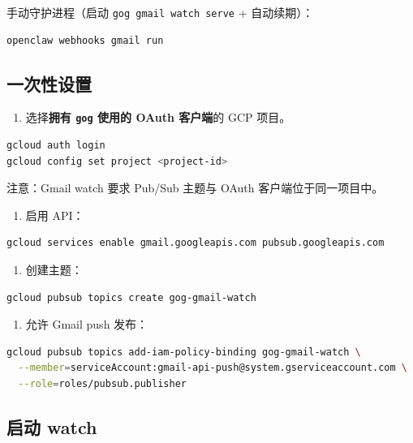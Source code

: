 手动守护进程（启动 \texttt{gog gmail watch serve} + 自动续期）：

\begin{lstlisting}[language=bash]
openclaw webhooks gmail run
\end{lstlisting}


\subsection{一次性设置}


\begin{enumerate}
  \item 选择\textbf{拥有 \texttt{gog} 使用的 OAuth 客户端}的 GCP 项目。
\end{enumerate}


\begin{lstlisting}[language=bash]
gcloud auth login
gcloud config set project <project-id>
\end{lstlisting}


注意：Gmail watch 要求 Pub/Sub 主题与 OAuth 客户端位于同一项目中。

\begin{enumerate}
  \item 启用 API：
\end{enumerate}


\begin{lstlisting}[language=bash]
gcloud services enable gmail.googleapis.com pubsub.googleapis.com
\end{lstlisting}


\begin{enumerate}
  \item 创建主题：
\end{enumerate}


\begin{lstlisting}[language=bash]
gcloud pubsub topics create gog-gmail-watch
\end{lstlisting}


\begin{enumerate}
  \item 允许 Gmail push 发布：
\end{enumerate}


\begin{lstlisting}[language=bash]
gcloud pubsub topics add-iam-policy-binding gog-gmail-watch \
  --member=serviceAccount:gmail-api-push@system.gserviceaccount.com \
  --role=roles/pubsub.publisher
\end{lstlisting}


\subsection{启动 watch}


